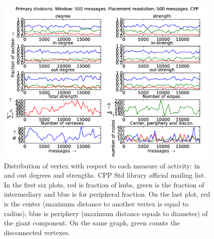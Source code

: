 \documentclass[%
 aip,
 jmp,%
 amsmath,amssymb,
 reprint,%
]{revtex4-1}
\begin{document}
\begin{figure}[hbtp] 
   \centering
        \includegraphics[width=\textwidth]{figs/CPP/500}
    \caption{Distribution of vertex with respect to each measure of activity: in and out degrees and strengths. CPP Std library official mailing list. In the first six plots, red is fraction of hubs, green is the fraction of intermediary and blue is for peripheral fraction. On the last plot, red is the center (maximum distance to another vertex is equal to radius), blue is periphery (maximum distance equals to diameter) of the giant component. On the same graph, green counts the disconnected vertexes.}
    \label{fig:cpp500}
\end{figure}
\end{document}
